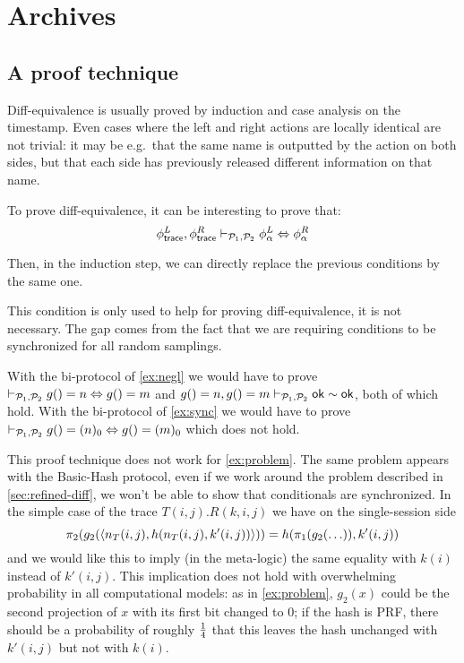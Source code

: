 \clearpage
\section{Archives}
\subsection{A proof technique}

Diff-equivalence is usually proved by induction and case analysis on
the timestamp. Even cases where the left and right actions are locally
identical are not trivial: it may be e.g.\ that the same name is outputted
by the action on both sides, but that each side has previously released
different information on that name.

To prove diff-equivalence, it can be interesting to prove that:
\[
  \phi^L_{\textsf{trace}}, \phi^R_{\textsf{trace}}
  \vdash_{\mathcal{P}_1,\mathcal{P}_2}
  \phi^L_\alpha \Leftrightarrow \phi^R_\alpha
\]

Then, in the induction step, we can directly replace the previous conditions by the same one.


This condition is only used to help for proving diff-equivalence, it is not necessary.
The gap comes from the fact that we are requiring conditions to be
synchronized for all random samplings.

\begin{example}
  With the bi-protocol of \cref{ex:negl} we would have to prove
  $\vdash_{\mathcal{P}_1,\mathcal{P}_2} g() = n \Leftrightarrow g() = m$ and
  $g()=n, g()=m \vdash_{\mathcal{P}_1,\mathcal{P}_2} \mathsf{ok} \sim \mathsf{ok}$, both of which hold.
  With the bi-protocol of \cref{ex:sync} we would have to prove
  $\vdash_{\mathcal{P}_1,\mathcal{P}_2} g() = (n)_0 \Leftrightarrow g() = (m)_0$ which does not hold.
\end{example}

\begin{example} \label{ex:indep}
  This proof technique does not work for \cref{ex:problem}.
  The same problem appears with the Basic-Hash protocol, even if we work around
  the problem described in \cref{sec:refined-diff}, we won't be able to show
  that conditionals are synchronized.  In the simple case of the trace
  $T(i,j).R(k,i,j)$ we have
  on the single-session side
  $$\pi_2(g_2(\langle n_T(i,j),h(n_T(i,j),k'(i,j)) \rangle)) =
  h(\pi_1(g_2(\ldots)),k'(i,j))$$
  and we would like this to imply (in the meta-logic)
  the same equality with $k(i)$ instead of $k'(i,j)$.
  This implication does not hold with overwhelming probability in all
  computational models: as in \cref{ex:problem}, $g_2(x)$ could be the second
  projection of $x$ with its first bit changed to $0$; if the hash is PRF,
  there should be a probability of roughly $1 \over 4$ that this leaves
  the hash unchanged with $k'(i,j)$ but not with $k(i)$.
\end{example}

